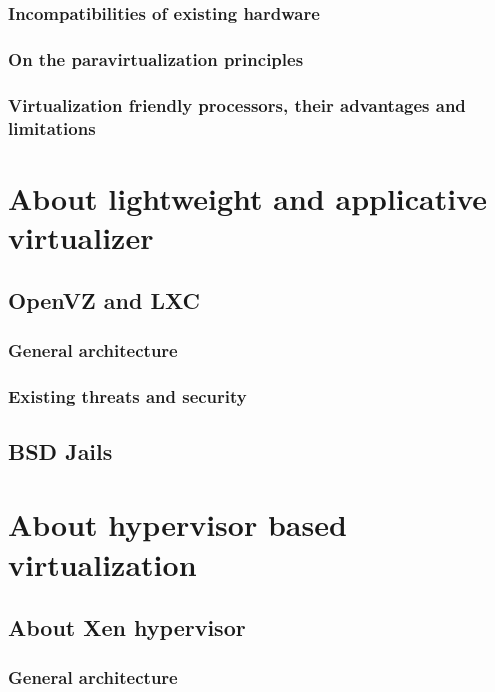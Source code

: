 \subsubsection{Incompatibilities of existing hardware}

\subsubsection{On the paravirtualization principles}

\subsubsection{Virtualization friendly processors, their advantages and limitations}


\section{About lightweight and applicative virtualizer}

\subsection{OpenVZ and LXC}

\subsubsection{General architecture}

\subsubsection{Existing threats and security}

\subsection{BSD Jails}


\section{About hypervisor based virtualization}

\subsection{About Xen hypervisor}

\subsubsection{General architecture}

